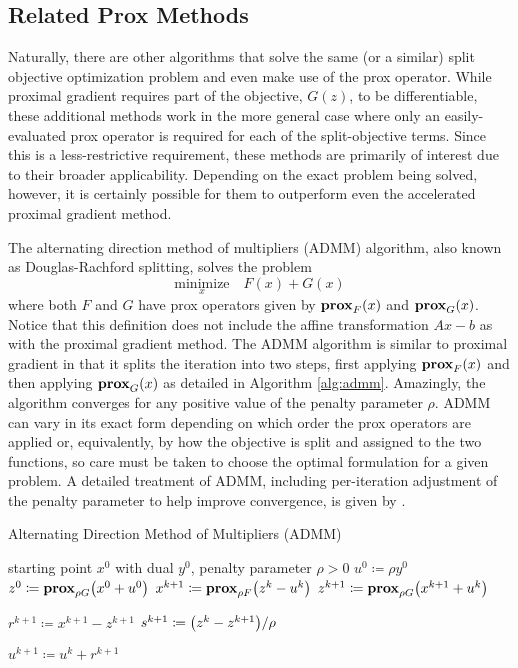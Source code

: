 \subsection{Related Prox Methods}
Naturally, there are other algorithms that solve the same (or a similar) split objective optimization problem and even make use of the prox operator. While proximal gradient requires part of the objective, $G(z)$, to be differentiable, these additional methods work in the more general case where only an easily-evaluated prox operator is required for each of the split-objective terms. Since this is a less-restrictive requirement, these methods are primarily of interest due to their broader applicability. Depending on the exact problem being solved, however, it is certainly possible for them to outperform even the accelerated proximal gradient method.

The alternating direction method of multipliers (ADMM) algorithm, also known as Douglas-Rachford splitting, solves the problem
\begin{equation}
 \underset{x}{\mathrm{minimize}} \quad F(x) + G(x)
\end{equation}
where both $F$ and $G$ have prox operators given by $\operatorname{\mathbf{prox}}_{F}(x)$ and $\operatorname{\mathbf{prox}}_{G}(x)$. Notice that this definition does not include the affine transformation $Ax - b$ as with the proximal gradient method. The ADMM algorithm is similar to proximal gradient in that it splits the iteration into two steps, first applying $\operatorname{\mathbf{prox}}_{F}(x)$ and then applying $\operatorname{\mathbf{prox}}_{G}(x)$ as detailed in Algorithm \ref{alg:admm}. Amazingly, the algorithm converges for any positive value of the penalty parameter $\rho$. ADMM can vary in its exact form depending on which order the prox operators are applied or, equivalently, by how the objective is split and assigned to the two functions, so care must be taken to choose the optimal formulation for a given problem. A detailed treatment of ADMM, including per-iteration adjustment of the penalty parameter to help improve convergence, is given by \textcite{BPC+11}.
\begin{algorithm}[tpb]
 \caption{Alternating Direction Method of Multipliers (ADMM)}
 \label{alg:admm}
 \begin{algorithmic}
  \GIVEN starting point $x^0$ with dual $y^0$, penalty parameter $\rho > 0$
  \STATE $u^0 \coloneqq \rho y^0$
  \STATE $z^0 \coloneqq \prox_{\rho G}\paren*{x^0 + u^0}$
  \REPEAT
   \STATE $x^{k+1} \coloneqq \prox_{\rho F}\paren*{z^k - u^k}$
   \STATE $z^{k+1} \coloneqq \prox_{\rho G}\paren*{x^{k+1} + u^k}$

   \STATE $r^{k+1} \coloneqq x^{k+1} - z^{k+1}$
   \STATE $s^{k+1} \coloneqq \paren*{z^k - z^{k+1}}/\rho$

   \STATE $u^{k+1} \coloneqq u^k + r^{k+1}$
 \end{algorithmic}
\end{algorithm}%

